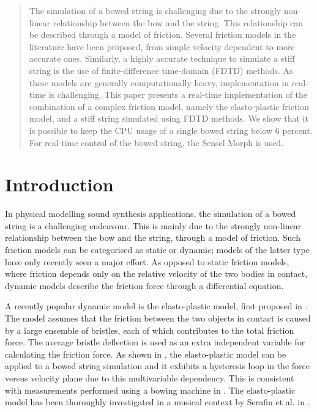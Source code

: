 \begin{abstract}
    The simulation of a bowed string is challenging due to the strongly non-linear relationship between the bow and the string. This relationship can be described through a model of friction. Several friction models in the literature have been proposed, from simple velocity dependent to more accurate ones. Similarly, a highly accurate technique to simulate a stiff string is the use of finite-difference time-domain (FDTD) methods. As these models are generally computationally heavy, implementation in real-time is challenging. This paper presents a real-time implementation of the combination of a complex friction model, namely the elasto-plastic friction model, and a stiff string simulated using FDTD methods. We show that it is possible to keep the CPU usage of a single bowed string below 6 percent. For real-time control of the bowed string, the Sensel Morph is used.
    \end{abstract}
    \section{Introduction}
    \label{sec:intro}
    In physical modelling sound synthesis applications, the simulation of a bowed string is a challenging endeavour. This is mainly due to the strongly non-linear relationship between the bow and the string, through a model of friction. Such friction models can be categorised as static or dynamic; models of the latter type have only recently seen a major effort. As opposed to static friction models, where friction depends only on the relative velocity of the two bodies in contact, dynamic models describe the friction force through a differential equation.
    
     A recently popular dynamic model is the elasto-plastic model, first proposed in \cite{Dupont2002}. The model assumes that the friction between the two objects in contact is caused by a large ensemble of bristles, each of which contributes to the total friction force. The average bristle deflection is used as an extra independent variable for calculating the friction force. As shown in \cite{Serafin2003}, the elasto-plastic model can be applied to a bowed string simulation and it exhibits a hysteresis loop in the force versus velocity plane due to this multivariable dependency.
     This is consistent with measurements performed using a bowing machine in \cite{Woodhouse2003}.
     The elasto-plastic model has been thoroughly investigated in a musical context by Serafin et al. in \cite{Serafin2003, Serafin2004, Avanzini2005}. 
    

